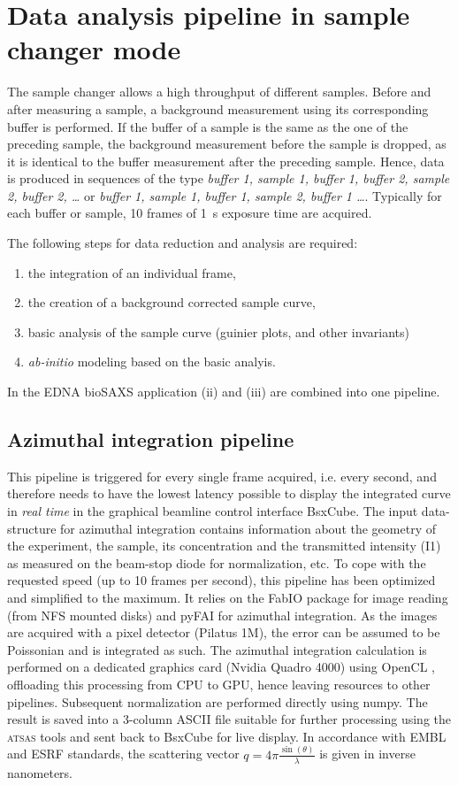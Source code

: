 \documentclass[preprint,pdf]{iucr}              %
\begin{document}
\section{Data analysis pipeline in sample changer mode}

The sample changer allows a high throughput of different samples.
Before and after measuring a sample, a background measurement using its
corresponding buffer is performed.
If the buffer of a sample is the same as the one of the preceding sample, the
background measurement before the sample is dropped, as it is identical to the
buffer measurement after the preceding sample.
Hence, data is produced in sequences of the type \textit{buffer 1, sample 1,
buffer 1, buffer 2, sample 2, buffer 2, \ldots}  or  \textit{buffer 1, sample 1,
buffer 1,  sample 2, buffer 1 \ldots}.
Typically for each buffer or sample, 10 frames of 1~s exposure time are acquired.

The following steps for data reduction and analysis are required:
\begin{enumerate}
\item the integration of an individual frame,
\item the creation of a background corrected sample curve,
\item basic analysis of the sample curve (guinier plots, and other invariants)
\item \textit{ab-initio} modeling based on the basic analyis.
\end{enumerate}
In the EDNA bioSAXS application (ii) and (iii) are combined into one pipeline.

\subsection{Azimuthal integration pipeline}
\label{AI}
This pipeline is triggered for every single frame acquired, i.e. every second,
and therefore needs to have the lowest latency possible to display the integrated curve
in \textit{real time} in the graphical beamline control interface BsxCube.
The input data-structure for azimuthal integration contains
information about the geometry of the experiment, the sample, its concentration
and the transmitted intensity (I1) as measured on the beam-stop diode for
normalization, etc.
To cope with the requested speed (up to 10 frames per second), this pipeline
has been optimized and simplified to the maximum.
It relies on the FabIO\cite{fabio} package for image reading (from NFS mounted disks) and
pyFAI\cite{pyFAI} for azimuthal integration.
As the images are acquired with a pixel detector (Pilatus 1M), the error can be
assumed to be Poissonian and is integrated as such.
The azimuthal integration calculation is performed on a dedicated graphics card
(Nvidia Quadro 4000) using OpenCL \cite{pyFAI_gpu}, offloading this processing
from CPU to GPU, hence leaving resources to other pipelines.
Subsequent normalization are performed directly using numpy\cite{numpy}.
The result is saved into a 3-column ASCII file suitable for further processing
using the \textsc{atsas} tools\cite{ATSAS1} and sent back to BsxCube for
live display.
In accordance with EMBL and ESRF standards, the scattering vector
$q=4\pi\frac{\sin(\theta)}{\lambda}$ is given in inverse nanometers.
\end{document}
